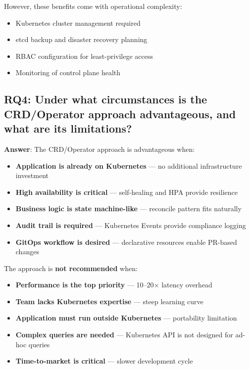 However, these benefits come with operational complexity:
\begin{itemize}
    \item Kubernetes cluster management required
    \item etcd backup and disaster recovery planning
    \item RBAC configuration for least-privilege access
    \item Monitoring of control plane health
\end{itemize}

\subsection{RQ4: Under what circumstances is the CRD/Operator approach advantageous, and what are its limitations?}

\textbf{Answer}: The CRD/Operator approach is advantageous when:

\begin{itemize}
    \item \textbf{Application is already on Kubernetes} --- no additional infrastructure investment
    \item \textbf{High availability is critical} --- self-healing and HPA provide resilience
    \item \textbf{Business logic is state machine-like} --- reconcile pattern fits naturally
    \item \textbf{Audit trail is required} --- Kubernetes Events provide compliance logging
    \item \textbf{GitOps workflow is desired} --- declarative resources enable PR-based changes
\end{itemize}

The approach is \textbf{not recommended} when:

\begin{itemize}
    \item \textbf{Performance is the top priority} --- 10--20$\times$ latency overhead
    \item \textbf{Team lacks Kubernetes expertise} --- steep learning curve
    \item \textbf{Application must run outside Kubernetes} --- portability limitation
    \item \textbf{Complex queries are needed} --- Kubernetes API is not designed for ad-hoc queries
    \item \textbf{Time-to-market is critical} --- slower development cycle
\end{itemize}

